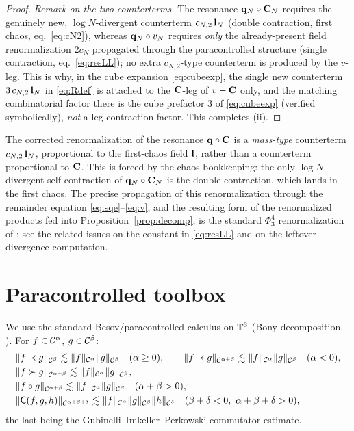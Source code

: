\begin{proof}
\medskip
\emph{Remark on the two counterterms.} The resonance $\mathbf{q}_N\circ\mathbf{C}_N$ requires
the genuinely new, $\log N$-divergent counterterm $c_{N,2}\,\mathbf{l}_N$ (double
contraction, first chaos, eq.~\eqref{eq:cN2}), whereas $\mathbf{q}_N\circ v_N$ requires
\emph{only} the already-present field renormalization $2c_N$ propagated through the
paracontrolled structure (single contraction, eq.~\eqref{eq:resLL}); no extra
$c_{N,2}$-type counterterm is produced by the $v$-leg. This is why, in the cube
expansion \eqref{eq:cubeexp}, the single new counterterm $3\,c_{N,2}\,\mathbf{l}_N$ in
\eqref{eq:Rdef} is attached to the $\mathbf{C}$-leg of $v-\mathbf{C}$ only, and the matching
combinatorial factor there is the cube prefactor $3$ of \eqref{eq:cubeexp} (verified
symbolically), \emph{not} a leg-contraction factor. This completes (ii).

\end{proof}

\begin{remark}
The corrected renormalization of the resonance $\mathbf{q}\circ\mathbf{C}$ is a
\emph{mass-type} counterterm $c_{N,2}\,\mathbf{l}_N$, proportional to the first-chaos
field $\mathbf{l}$, rather than a counterterm proportional to $\mathbf{C}$. This is forced by
the chaos bookkeeping: the only $\log N$-divergent self-contraction of
$\mathbf{q}_N\circ\mathbf{C}_N$ is the double contraction, which lands in the first chaos. The
precise propagation of this renormalization through the remainder equation
\eqref{eq:sqe}--\eqref{eq:v}, and the resulting form of the renormalized products fed
into Proposition~\ref{prop:decomp}, is the standard $\Phi^4_3$ renormalization of
\cite{CC18,MW17b,EW24}; see the related issues on the constant in
\eqref{eq:resLL} and on the leftover-divergence computation.
\end{remark}

\section*{Paracontrolled toolbox}

We use the standard Besov/paracontrolled calculus on $\mathbb{T}^3$ (Bony decomposition,
\cite{BCD11,GIP15}). For $f\in\mathcal{C}^\alpha$, $g\in\mathcal{C}^\beta$:
\begin{align}
&\|f\prec g\|_{\qoneC^{\beta}}\lesssim\|f\|_{\qoneC^{\alpha}}\|g\|_{\qoneC^{\beta}}\quad(\alpha\ge 0),\qquad
\|f\prec g\|_{\qoneC^{\alpha+\beta}}\lesssim\|f\|_{\qoneC^{\alpha}}\|g\|_{\qoneC^{\beta}}\quad(\alpha<0),\label{eq:para1}\\
&\|f\succ g\|_{\qoneC^{\alpha+\beta}}\lesssim\|f\|_{\qoneC^{\alpha}}\|g\|_{\qoneC^{\beta}},\label{eq:para2}\\
&\|f\circ g\|_{\qoneC^{\alpha+\beta}}\lesssim\|f\|_{\qoneC^{\alpha}}\|g\|_{\qoneC^{\beta}}\quad(\alpha+\beta>0),\label{eq:res}\\
&\|\mathsf C(f,g,h)\|_{\qoneC^{\alpha+\beta+\delta}}\lesssim\|f\|_{\qoneC^{\alpha}}\|g\|_{\qoneC^{\beta}}\|h\|_{\qoneC^{\delta}}\quad(\beta+\delta<0,\ \alpha+\beta+\delta>0),\label{eq:comm}
\end{align}
the last being the Gubinelli--Imkeller--Perkowski commutator estimate.

